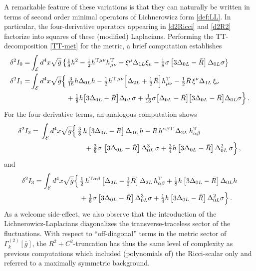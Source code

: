 \documentclass[preprint,preprintnumbers,amsmath,amssymb,nofootinbib,APS]{revtex4}
\newcommand{\be}{\begin{equation}}
\newcommand{\ee}{\end{equation}}
\let\m=\mu    \let\n=\nu    \let\x=\xi      \let\r=\rho \let\om=\omega
\let\s=\sigma \let\t=\tau   \let\vph=\varphi \let\ph=\phi \let\c=\chi
\newcommand{\2}{\sqrt{2\,}}
\newcommand{\gb}{\bar{g}}
\newcommand{\Rb}{\bar{R}}
\begin{document}
\begin{appendix}
A remarkable feature of these variations is that they can naturally be written in terms of second order minimal operators of
Lichnerowicz form \eqref{def:LL}. In particular, the four-derivative operators appearing in \eqref{d2Ricci} and \eqref{d2R2} factorize into squares of these (modified) Laplacians. Performing the TT-decomposition \eqref{TT-met} for the metric, a brief computation establishes
%
\be\label{varEH}
\begin{split}
\d^2 I_0 = & \int_\mathcal{E} d^4x \sqrt{\gb} \left\{ \tfrac{1}{8} h^2 - \tfrac{1}{2} h^{{\rm T} \mu\nu} h^{\rm T}_{\mu\nu} - \xi^\mu \Delta_{1L} \xi_\mu - \tfrac{1}{8} \sigma \left[ 3 \Delta_{0L} - \Rb \right] \Delta_{0L} \sigma \right\} \\
%
\d^2 I_1
= & \int_\mathcal{E} d^4x \sqrt{\gb} \Big\{ \, \tfrac{3}{16} h \D_{0L} h  - \tfrac{1}{2} h^{\rm T\,\m\n} \Big[  \D_{2L} + \tfrac{1}{2} \Rb \Big] h^{\rm T}_{\m\n} - \tfrac{1}{2} \Rb \, \xi^\n \D_{1L} \, \xi_\n \\
 &\, \qquad \qquad \quad 
 + \tfrac{1}{8} h \big[ 3\D_{0L}-\Rb \big]\D_{0L} \s + \tfrac{1}{16} \s \big[ \D_{0L}-\Rb \big] \big[3\D_{0L}-\Rb \big] \D_{0L}\s  \Big\} \, .
\end{split}
\ee
%
For the four-derivative terms, an analogous computation shows
%
\be\label{varR2}
\begin{split}
\delta^2 I_2  = \, \int_\mathcal{E} d^4x \sqrt{\gb}   \Big\{& \, \tfrac{3}{8}\,h\left[3\Delta_{0L}-\Rb\right]\Delta_{0L}\, h -\Rb\,h^{\alpha \beta{\rm T}}\,\Delta_{2L} \,h_{\alpha \beta}^{\rm T} \\&\quad\,
+ \tfrac{3}{8}\sigma \,\left[3\Delta_{0L}-\Rb\right]\Delta_{0L}^3 \,\sigma  
 + \tfrac{3}{4}h\left[3\Delta_{0L}-\Rb\right]\Delta_{0L}^2\,\sigma \Big\}\,,
\end{split}
\ee
%
and
%
\be\label{varRmn2}
\begin{split}
\delta^2 I_3 = \int_\mathcal{E}  d^4x  \sqrt{\gb} \Big\{& \,
\tfrac{1}{2} \, h^{{\rm T}\alpha \beta} \left[ \Delta_{2L} - \tfrac{1}{2} \Rb  \right] \Delta_{2L} \, h_{\alpha \beta}^{\rm T} 
+ \tfrac{1}{8} h \left[ 3 \Delta_{0L} - \Rb  \right] \Delta_{0L} h \\
& \, 
+ \tfrac{1}{8} \sigma \left[ 3 \Delta_{0L} - \Rb \right] \Delta_{0L}^3 \sigma 
+ \tfrac{1}{4} h \left[ 3 \Delta_{0L} - \Rb \right] \Delta_{0L}^2 \sigma 
\Big\} \, .
\end{split}
\ee
%
As a welcome side-effect, we also observe that the introduction of the Lichnerowicz-Laplacians
diagonalizes the transverse-traceless sector of the fluctuations. With respect to ``off-diagonal''
terms in the metric sector of $\Gamma^{(2)}_k[\gb]$, the $R^2 + C^2$-truncation has thus the same 
level of complexity as previous computations which included (polynomials of) the Ricci-scalar only 
and referred to a maximally symmetric background.  


\end{appendix}
\end{document}
